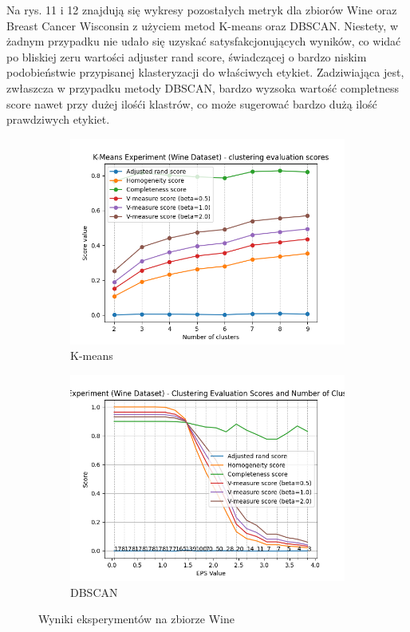 \documentclass[12pt]{article}
\begin{document}
Na rys. 11 i 12 znajdują się wykresy pozostałych metryk dla zbiorów Wine oraz Breast Cancer Wisconsin z użyciem metod K-means oraz DBSCAN.
Niestety, w żadnym przypadku nie udało się uzyskać satysfakcjonujących wyników, co widać po bliskiej zeru wartości adjuster rand score, świadczącej o bardzo niskim podobieństwie przypisanej klasteryzacji do właściwych etykiet.
Zadziwiająca jest, zwłaszcza w przypadku metody DBSCAN, bardzo wyzsoka wartość completness score nawet przy dużej ilośći klastrów, co może sugerować bardzo dużą ilość prawdziwych etykiet.

\begin{figure}[H]
    \centering
    \begin{subfigure}[t]{0.3\textwidth}
        \includegraphics[width=\linewidth]{img/other_datasets/wine_kmeans_scores.png}
        \caption{K-means}
    \end{subfigure}
    \hspace{3em}
    \begin{subfigure}[t]{0.3\textwidth}
        \includegraphics[width=\linewidth]{img/other_datasets/wine_dbscan_scores.png}
        \caption{DBSCAN}
    \end{subfigure}
    \caption{Wyniki eksperymentów na zbiorze Wine}
\end{figure}
\end{document}
